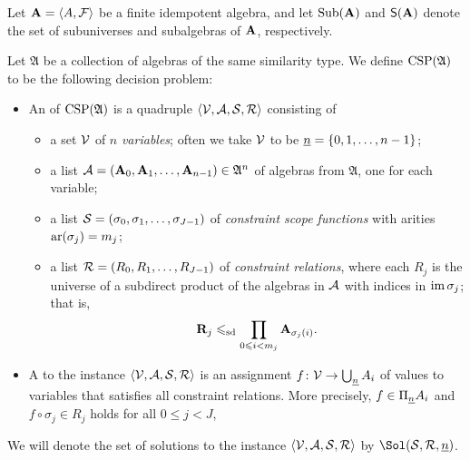 Let $\mathbf{A} = \langle A, \mathcal{F}\rangle$ be a finite idempotent algebra,
and let $\operatorname{Sub}(\mathbf{A})$ and $\mathsf{S}(\mathbf{A})$ denote the set of subuniverses and subalgebras
of $\mathbf{A}$, respectively. 
\begin{definition}
  \label{def:csp}
  Let $\mathfrak{A}$ be a collection of algebras of the same similarity type.
  We define $\operatorname{CSP}(\mathfrak{A})$ to be the following decision problem:
\begin{itemize}
\item  An   of $\operatorname{CSP}(\mathfrak{A})$
  is a quadruple $\langle\mathcal{V}, \mathcal{A}, \mathcal{S}, \mathcal{R}\rangle$ consisting of
  \begin{itemize}
  \item a set $\mathcal{V}$ of $n$ \emph{variables}; often we take $\mathcal{V}$ to be
    $\underline{n}= \{0, 1, \dots, n-1\}$;
  \item a list $\mathcal{A} = (\mathbf{A}_0, \mathbf{A}_1, \dots, \mathbf{A}_{n-1})\in \mathfrak{A}^n$ of
    algebras from $\mathfrak{A}$, one for each variable;
  \item a list $\mathcal{S} = (\sigma_0, \sigma_1, \dots, \sigma_{J-1})$
    of \emph{constraint scope functions}
    with arities $\operatorname{ar}(\sigma_j) = m_j$;
  \item a list $\mathcal{R} = (R_0, R_1, \dots, R_{J-1})$ of \emph{constraint relations}, where
    each $R_j$ is the universe of a subdirect product of the algebras
    in $\mathcal{A}$ with indices in $\operatorname{im} \sigma_j$; that is,
    \[\mathbf{R}_j \leqslant_{\mathrm{sd}} \prod_{0\leqslant i < m_j}\mathbf{A}_{\sigma_j(i)}.\]
  \end{itemize}
\item A  to the instance $\langle\mathcal{V}, \mathcal{A}, \mathcal{S}, \mathcal{R}\rangle$
  is an assignment %
  $f \colon \mathcal{V} \to \bigcup_{\underline{n}}A_i$ %
  of values to variables that satisfies all constraint relations.  More precisely,
  $f\in \Pi_{\underline{n}}A_i$ and $f \circ \sigma_j \in R_j$ holds for all $0\leq j < J$,
  
\end{itemize}
\end{definition}
We will denote the set of solutions to the instance $\langle\mathcal{V}, \mathcal{A}, \mathcal{S},\mathcal{R}\rangle$ by $\Sol(\sS,\sR, \nn)$.

